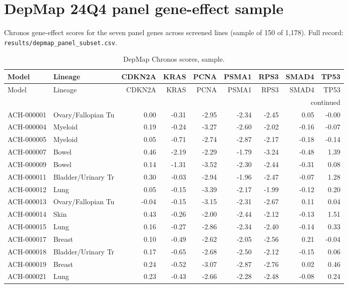 \section{DepMap 24Q4 panel gene-effect sample}
Chronos gene-effect scores for the seven panel genes across screened lines (sample of 150 of 1{,}178). Full record: \texttt{results/depmap\_panel\_subset.csv}.
\begin{footnotesize}\begin{longtable}{llrrrrrrr}
\caption{DepMap Chronos scores, sample.}\\ \hline\hline
Model & Lineage & CDKN2A & KRAS & PCNA & PSMA1 & RPS3 & SMAD4 & TP53 \\ \hline \endfirsthead
\hline\hline Model & Lineage & CDKN2A & KRAS & PCNA & PSMA1 & RPS3 & SMAD4 & TP53 \\ \hline \endhead
\hline \multicolumn{9}{r}{continued}\\ \endfoot \hline\hline \endlastfoot
ACH-000001 & Ovary/Fallopian Tu & 0.00 & -0.31 & -2.95 & -2.34 & -2.45 & 0.05 & -0.00 \\
ACH-000004 & Myeloid & 0.19 & -0.24 & -3.27 & -2.60 & -2.02 & -0.16 & -0.07 \\
ACH-000005 & Myeloid & 0.05 & -0.71 & -2.74 & -2.87 & -2.17 & -0.18 & -0.14 \\
ACH-000007 & Bowel & 0.46 & -2.19 & -2.29 & -1.79 & -3.24 & -0.48 & 1.39 \\
ACH-000009 & Bowel & 0.14 & -1.31 & -3.52 & -2.30 & -2.44 & -0.31 & 0.08 \\
ACH-000011 & Bladder/Urinary Tr & 0.30 & -0.03 & -2.94 & -1.96 & -2.47 & -0.07 & 1.28 \\
ACH-000012 & Lung & 0.05 & -0.15 & -3.39 & -2.17 & -1.99 & -0.12 & 0.20 \\
ACH-000013 & Ovary/Fallopian Tu & -0.04 & -0.15 & -3.15 & -2.31 & -2.67 & 0.11 & 0.04 \\
ACH-000014 & Skin & 0.43 & -0.26 & -2.00 & -2.44 & -2.12 & -0.13 & 1.51 \\
ACH-000015 & Lung & 0.16 & -0.27 & -2.86 & -2.34 & -2.40 & -0.14 & 0.33 \\
ACH-000017 & Breast & 0.10 & -0.49 & -2.62 & -2.05 & -2.56 & 0.21 & -0.04 \\
ACH-000018 & Bladder/Urinary Tr & 0.17 & -0.65 & -2.68 & -2.50 & -2.12 & -0.15 & 0.06 \\
ACH-000019 & Breast & 0.24 & -0.52 & -3.07 & -2.87 & -2.76 & 0.02 & 0.46 \\
ACH-000021 & Lung & 0.23 & -0.43 & -2.66 & -2.28 & -2.48 & -0.08 & 0.24 \\

\end{longtable}
\end{footnotesize}

